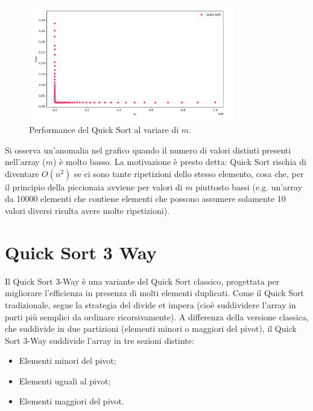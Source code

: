 \documentclass[a4paper, 12pt, oneside]{book}
\begin{document}
\begin{figure}[H]
    \centering
    \includegraphics[width=0.8\textwidth]{images/grafico_quick_sort_m.png}
    \caption{Performance del Quick Sort al variare di \(m\).}
    \label{fig:quick_sort_m}
\end{figure}

\noindent Si osserva un'anomalia nel grafico quando il numero di valori distinti presenti nell'array (\(m\)) è molto basso. La motivazione è presto detta: Quick Sort rischia di diventare $O(n^2)$ se ci sono tante ripetizioni dello stesso elemento, cosa che, per il principio della piccionaia avviene per valori di $m$ piuttosto bassi (e.g. un'array da 10000 elementi che contiene elementi che possono assumere solamente 10 valori diversi risulta avere molte ripetizioni).


\chapter{Quick Sort 3 Way}\label{chap:Quick Sort 3 Way} %

Il Quick Sort 3-Way è una variante del Quick Sort classico, progettata per migliorare l'efficienza in presenza di molti elementi duplicati. Come il Quick Sort tradizionale, segue la strategia del divide et impera (cioè suddividere l'array in parti più semplici da ordinare ricorsivamente).
A differenza della versione classica, che suddivide in due partizioni (elementi minori o maggiori del pivot), il Quick Sort 3-Way suddivide l'array in tre sezioni distinte:

\begin{itemize}
    \item Elementi minori del pivot;
    \item Elementi uguali al pivot;
    \item Elementi maggiori del pivot.
\end{itemize}
\end{document}
